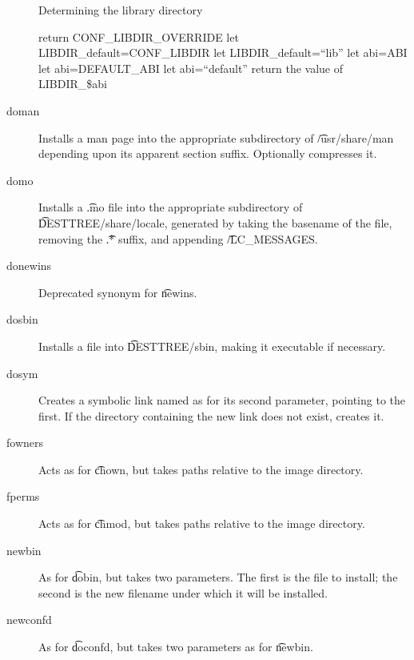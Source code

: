 \begin{description}
\begin{algorithm}
\caption{Determining the library directory} \label{ebuild-libdir}
\begin{algorithmic}[1]
    \STATE return CONF\_LIBDIR\_OVERRIDE
\ENDIF
{}
    \STATE let LIBDIR\_default=CONF\_LIBDIR
\ELSE
    \STATE let LIBDIR\_default=``lib''
\ENDIF
{}
    \STATE let abi=ABI
    \STATE let abi=DEFAULT\_ABI
\ELSE
    \STATE let abi=``default''
\ENDIF
\STATE return the value of LIBDIR\_\$abi
\end{algorithmic}
\end{algorithm}

\item[doman] Installs a man page into the appropriate subdirectory of \t{/usr/share/man} depending
    upon its apparent section suffix. Optionally compresses it.

\item[domo] Installs a \t{.mo} file into the appropriate subdirectory of \t{DESTTREE/share/locale},
    generated by taking the basename of the file, removing the \t{.*} suffix, and appending
    \t{/LC\_MESSAGES}.

\item[donewins] Deprecated synonym for \t{newins}.

\item[dosbin] Installs a file into \t{DESTTREE/sbin}, making it executable if necessary.

\item[dosym] Creates a symbolic link named as for its second parameter, pointing to the first. If
    the directory containing the new link does not exist, creates it.

\item[fowners] Acts as for \t{chown}, but takes paths relative to the image directory.

\item[fperms] Acts as for \t{chmod}, but takes paths relative to the image directory.

\item[newbin] As for \t{dobin}, but takes two parameters. The first is the file to install; the
    second is the new filename under which it will be installed.

\item[newconfd] As for \t{doconfd}, but takes two parameters as for \t{newbin}.


\end{description}
